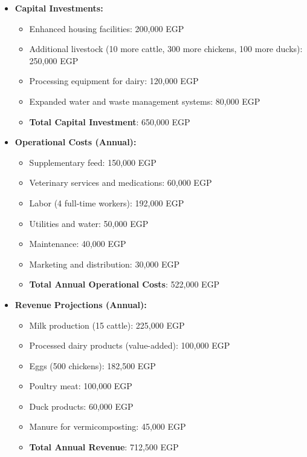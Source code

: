 \begin{itemize}
    \item \textbf{Capital Investments:}
    \begin{itemize}
        \item Enhanced housing facilities: 200,000 EGP
        \item Additional livestock (10 more cattle, 300 more chickens, 100 more ducks): 250,000 EGP
        \item Processing equipment for dairy: 120,000 EGP
        \item Expanded water and waste management systems: 80,000 EGP
        \item \textbf{Total Capital Investment}: 650,000 EGP
    \end{itemize}
    
    \item \textbf{Operational Costs (Annual):}
    \begin{itemize}
        \item Supplementary feed: 150,000 EGP
        \item Veterinary services and medications: 60,000 EGP
        \item Labor (4 full-time workers): 192,000 EGP
        \item Utilities and water: 50,000 EGP
        \item Maintenance: 40,000 EGP
        \item Marketing and distribution: 30,000 EGP
        \item \textbf{Total Annual Operational Costs}: 522,000 EGP
    \end{itemize}
    
    \item \textbf{Revenue Projections (Annual):}
    \begin{itemize}
        \item Milk production (15 cattle): 225,000 EGP
        \item Processed dairy products (value-added): 100,000 EGP
        \item Eggs (500 chickens): 182,500 EGP
        \item Poultry meat: 100,000 EGP
        \item Duck products: 60,000 EGP
        \item Manure for vermicomposting: 45,000 EGP
        \item \textbf{Total Annual Revenue}: 712,500 EGP
    \end{itemize}
    

\end{itemize}
